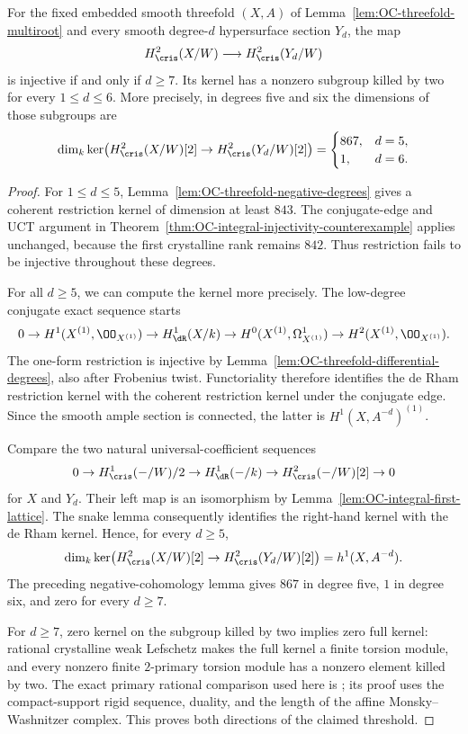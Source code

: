 \begin{theorem}
\label{thm:OC-exact-integral-injectivity-degrees}
For the fixed embedded smooth threefold $(X,A)$ of
Lemma~\ref{lem:OC-threefold-multiroot} and every smooth degree-$d$ hypersurface section $Y_d$, the map
\[
            H^2_{\cris}(X/W)\longrightarrow H^2_{\cris}(Y_d/W)
\]
is injective if and only if $d\geq7$.  Its kernel has a nonzero subgroup killed by two for every $1\leq d\leq6$.
More precisely, in degrees five and six the dimensions of those subgroups are
\[
 \dim_k\ker\bigl(H^2_{\cris}(X/W)[2]\to H^2_{\cris}(Y_d/W)[2]\bigr)
   =\begin{cases}867,&d=5,\\1,&d=6.\end{cases}
\]
\end{theorem}
\begin{proof}
For $1\leq d\leq5$, Lemma~\ref{lem:OC-threefold-negative-degrees} gives a coherent restriction kernel of dimension at least $843$.  The conjugate-edge and UCT argument in Theorem~\ref{thm:OC-integral-injectivity-counterexample} applies unchanged, because the first crystalline rank remains $842$.  Thus restriction fails to be injective throughout these degrees.

For all $d\geq5$, we can compute the kernel more precisely.  The low-degree conjugate exact sequence starts
\[
 0\to H^1(X^{(1)},\OO_{X^{(1)}})
   \to H^1_{\dR}(X/k)
   \to H^0(X^{(1)},\Omega^1_{X^{(1)}})
   \to H^2(X^{(1)},\OO_{X^{(1)}}).
\]
The one-form restriction is injective by
Lemma~\ref{lem:OC-threefold-differential-degrees}, also after Frobenius twist.  Functoriality therefore identifies the de Rham restriction kernel with the coherent restriction kernel under the conjugate edge.  Since the smooth ample section is connected, the latter is $H^1(X,A^{-d})^{(1)}$.

Compare the two natural universal-coefficient sequences
\[
 0\to H^1_{\cris}(-/W)/2\to H^1_{\dR}(-/k)
               \to H^2_{\cris}(-/W)[2]\to0
\]
for $X$ and $Y_d$.  Their left map is an isomorphism by
Lemma~\ref{lem:OC-integral-first-lattice}.  The snake lemma consequently identifies the right-hand kernel with the de Rham kernel.  Hence, for every $d\geq5$,
\[
 \dim_k\ker\bigl(H^2_{\cris}(X/W)[2]\to H^2_{\cris}(Y_d/W)[2]\bigr)
                       =h^1(X,A^{-d}).
\]
The preceding negative-cohomology lemma gives $867$ in degree five, $1$ in degree six, and zero for every $d\geq7$.

For $d\geq7$, zero kernel on the subgroup killed by two implies zero full kernel: rational crystalline weak Lefschetz makes the full kernel a finite torsion module, and every nonzero finite $2$-primary torsion module has a nonzero element killed by two.  The exact primary rational comparison used here is
\cite[Appendix~9, Theorem~9.1 and Corollary~9.3, pp.~63--64, arXiv version~3]{NakkajimaYobuko2022}; its proof uses the compact-support rigid sequence, duality, and the length of the affine Monsky--Washnitzer complex.  This proves both directions of the claimed threshold.
\end{proof}


